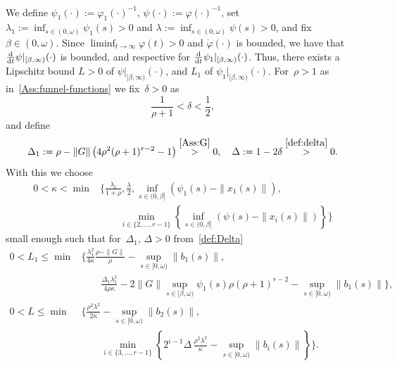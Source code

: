 \documentclass[ envcountsect, envcountsame]{svjour3}
\newcommand{\ddt}{\tfrac{\text{\normalfont d}}{\text{\normalfont d}t}}
\newcommand{\vp}{\varphi}
\begin{document}
\ \\
We define $\psi_1(\cdot) := \vp_1(\cdot)^{-1}$, $\psi(\cdot) := \vp(\cdot)^{-1}$,
set $\lambda_1 := \inf_{s \in (0,\omega)} \psi_1(s) > 0$ and $\lambda := \inf_{s \in (0,\omega)} \psi(s) > 0$, and
fix $\beta \in (0,\omega)$.
Since $\liminf_{t \to \infty} \vp(t) > 0$ and $\dot \vp(\cdot)$ is bounded, we have that $\ddt \psi|_{[\beta, \infty)}(\cdot)$ is bounded, and respective for $\ddt \psi_1|_{[\beta, \infty)}(\cdot)$.
Thus, there exists a Lipschitz bound $L > 0$ of $\psi|_{[\beta,\infty)}(\cdot)$, and $L_1$ of $\psi_{1}|_{[\beta,\infty)}(\cdot)$.
%
For~$\rho>1$ as in~\ref{Ass:funnel-functions} we fix~$\delta > 0$ as
\begin{equation} \label{def:delta}
\frac{1}{\rho + 1} < \delta < \frac{1}{2},
\end{equation}
and define
\begin{equation} \label{def:Delta}
\Delta_1 := \rho - \|G\|\left( 4 \rho^2 (\rho+1)^{r-2} - 1 \right) \overset{\rm \ref{Ass:G}}{>} 0, 
\quad \Delta := 1-2 \delta \overset{\eqref{def:delta}}{>} 0.
\end{equation}
%
With this we choose
\begin{equation*} %
\begin{aligned}
0 < \kappa < \min &\Bigg\{ \frac{\lambda_1}{1+\rho}, 
\frac{\lambda}{2}, 
\inf_{s \in (0,\beta]} \left(\psi_1(s) - \| x_{1}(s)\| \right), \\
& \qquad \min_{i \in \{2,\ldots,r-1\}} \left\{\inf_{s \in (0,\beta]} \left(\psi(s) - \| x_{i}(s)\| \right)\right\} \Bigg\} 
\end{aligned}
\end{equation*}
small enough such that for~$\Delta_1, \, \Delta > 0$ from~\eqref{def:Delta}
\begin{subequations}
\begin{align}
0 < L_1  \le  \min &\Bigg\{ 
\frac{ \lambda_1^2}{4 \kappa} \frac{\rho - \|G\|}{\rho} - \sup_{s \in [0,\omega)}\|b_1(s)\|,  \label{eq:L1} \\
& \qquad
 \frac{\Delta_1 \lambda_1^2}{4 \rho \kappa} - 2 \|G\| \sup_{s \in [\beta,\omega)} \psi_1(s) \rho (\rho+1)^{r-2} - \sup_{s \in [0,\omega)} \|b_1(s)\|
\Bigg\} \nonumber, \\
%
0 < L  \le \min &\Bigg\{ \frac{\rho^2 \lambda^2}{2 \kappa}  - \sup_{s \in [0,\omega)}  \|b_2(s)\|, \label{eq:L}  \\
& \qquad 
\min_{i \in \{3,\ldots,r-1\}} \left\{ 2^{i-1} \Delta \, \frac{\rho^2 \lambda^2}{ \kappa} - \sup_{s \in [0,\omega) } \| b_i(s)\| \right\} \Bigg\}.
 \nonumber
\end{align}
\end{subequations}
\end{document}

